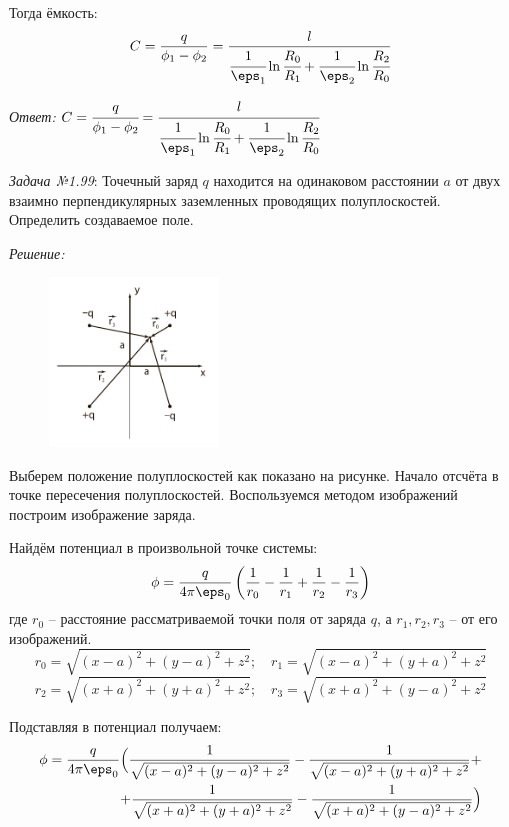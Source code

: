 Тогда ёмкость:
\[
	C = \frac{q}{\phi_1 - \phi_2} = 
	\frac{l}{ \cfrac{1}{\eps_1}\ln\cfrac{R_0}{R_1} + 
	\cfrac{1}{\eps_2}\ln\cfrac{R_2}{R_0}}
\]

\emph{Ответ:} \(
	C = \cfrac{q}{\phi_1 - \phi_2} = 
	\cfrac{l}{ \cfrac{1}{\eps_1}\ln\cfrac{R_0}{R_1} + 
	\cfrac{1}{\eps_2}\ln\cfrac{R_2}{R_0}}
\)

\newpage

\emph{Задача №1.99}: Точечный заряд \( q \) находится на одинаковом 
расстоянии \( a \) от двух взаимно перпендикулярных заземленных проводящих 
полуплоскостей. Определить создаваемое поле.

\emph{Решение:}

\begin{figure}
	\vspace{-5ex}
	\includegraphics[width=0.4\textwidth]{pdf/image_1_99}
\end{figure}

Выберем положение полуплоскостей как показано на рисунке. Начало отсчёта 
в точке пересечения полуплоскостей. Воспользуемся методом изображений 
построим изображение заряда. 

Найдём потенциал в произвольной точке системы:
\[ 
	\phi = \frac{q}{4\pi\eps_0}\left( \frac{1}{r_0} - \frac{1}{r_1} + 
	\frac{1}{r_2} - \frac{1}{r_3} \right) 
\] 
где \( r_0 \) -- расстояние рассматриваемой точки поля от заряда \( q \), а 
\( r_1, r_2, r_3 \) -- от его изображений.
\[
	r_0 = \sqrt{(x-a)^2 + (y-a)^2 + z^2};\quad
	r_1 = \sqrt{(x-a)^2 + (y+a)^2 + z^2}
\]
\[
	r_2 = \sqrt{(x+a)^2 + (y+a)^2 + z^2};\quad
	r_3 = \sqrt{(x+a)^2 + (y-a)^2 + z^2}
\]

Подставляя в потенциал получаем:
\begin{equation*}
\begin{split}
	\phi = \frac{q}{4\pi\eps_0}\Big(
		\frac{1}{\sqrt{(x-a)^2 + (y-a)^2 + z^2}} - 
		\frac{1}{\sqrt{(x-a)^2 + (y+a)^2 + z^2}} + \\ +
		\frac{1}{\sqrt{(x+a)^2 + (y+a)^2 + z^2}} -
		\frac{1}{\sqrt{(x+a)^2 + (y-a)^2 + z^2}}
	\Big)
\end{split}
\end{equation*}

